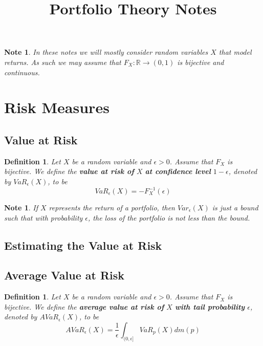 \documentclass[12pt]{amsart}
\newtheorem{defn}[thm]{Definition}
\newtheorem{note}[thm]{Note}
\newcommand{\ep}{\epsilon}
\newcommand{\R}{\mathbb{R}}
\begin{document}
\title{Portfolio Theory Notes}
\maketitle

\tableofcontents

\begin{note}
In these notes we will mostly consider random variables $X$ that model returns. As such we may assume that $F_X:\R \rightarrow (0,1)$ is bijective and continuous. 
\end{note}

\section{Risk Measures}

\subsection{Value at Risk}

\begin{defn}
Let $X$ be a random variable and $\ep>0$. Assume that $F_X$ is bijective. We define the \textbf{value at risk of } $X$ \textbf{at confidence level } $1-\ep$, denoted by $VaR_{\ep}(X)$, to be $$VaR_{\ep}(X) = -F^{-1}_X(\ep)$$
\end{defn}

\begin{note}
If $X$ represents the return of a portfolio, then $Var_{\ep}(X)$ is just a bound such that with probability $\ep$, the loss of the portfolio is not less than the bound.  
\end{note}

\subsection{Estimating the Value at Risk}

\subsection{Average Value at Risk}

 \begin{defn}
Let $X$ be a random variable and $\ep > 0$. Assume that $F_X$ is bijective. We define the \textbf{average value at risk of } $X$ \textbf{with tail probability } $\ep$, denoted by $AVaR_{\ep}(X)$, to be $$AVaR_{\ep}(X) = \frac{1}{\ep}\int_{(0,\ep]}VaR_p(X)dm(p)$$
\end{defn}
\end{document}
